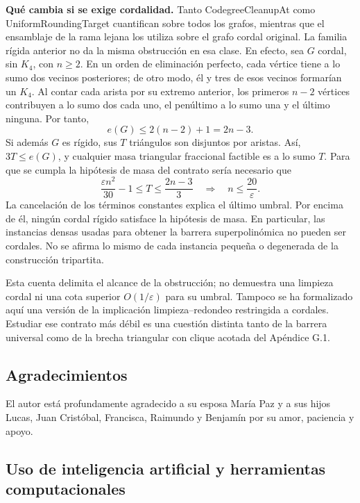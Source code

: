 \documentclass[spanish,11pt,a4paper]{article}
\begin{document}
\textbf{Qué cambia si se exige cordalidad.} Tanto {\ttfamily\small CodegreeClea\discretionary{\hbox{\ensuremath{\hookrightarrow}}}{}{}nupAt} como {\ttfamily\small UniformRound\discretionary{\hbox{\ensuremath{\hookrightarrow}}}{}{}ingTarget} cuantifican sobre todos los grafos, mientras que el ensamblaje de la rama lejana los utiliza sobre el grafo cordal original. La familia rígida anterior no da la misma obstrucción en esa clase. En efecto, sea \(G\) cordal, sin \(K_4\), con \(n\ge2\). En un orden de eliminación perfecto, cada vértice tiene a lo sumo dos vecinos posteriores; de otro modo, él y tres de esos vecinos formarían un \(K_4\). Al contar cada arista por su extremo anterior, los primeros \(n-2\) vértices contribuyen a lo sumo dos cada uno, el penúltimo a lo sumo una y el último ninguna. Por tanto, \[
e(G)\le2(n-2)+1=2n-3.
\tag{G.4}
\] Si además \(G\) es rígido, sus \(T\) triángulos son disjuntos por aristas. Así, \(3T\le e(G)\), y cualquier masa triangular fraccional factible es a lo sumo \(T\). Para que se cumpla la hipótesis de masa del contrato sería necesario que \[
\frac{\varepsilon n^2}{30}-1
\le T\le\frac{2n-3}{3}
\quad\Longrightarrow\quad n\le\frac{20}{\varepsilon}.
\tag{G.5}
\] La cancelación de los términos constantes explica el último umbral. Por encima de él, ningún cordal rígido satisface la hipótesis de masa. En particular, las instancias densas usadas para obtener la barrera superpolinómica no pueden ser cordales. No se afirma lo mismo de cada instancia pequeña o degenerada de la construcción tripartita.

Esta cuenta delimita el alcance de la obstrucción; no demuestra una limpieza cordal ni una cota superior \(O(1/\varepsilon)\) para su umbral. Tampoco se ha formalizado aquí una versión de la implicación limpieza--redondeo restringida a cordales. Estudiar ese contrato más débil es una cuestión distinta tanto de la barrera universal como de la brecha triangular con clique acotada del Apéndice G.1.

\subsection{Agradecimientos}\label{agradecimientos}

El autor está profundamente agradecido a su esposa María Paz y a sus hijos Lucas, Juan Cristóbal, Francisca, Raimundo y Benjamín por su amor, paciencia y apoyo.

\subsection{Uso de inteligencia artificial y herramientas computacionales}\label{uso-de-inteligencia-artificial-y-herramientas-computacionales}
\end{document}

